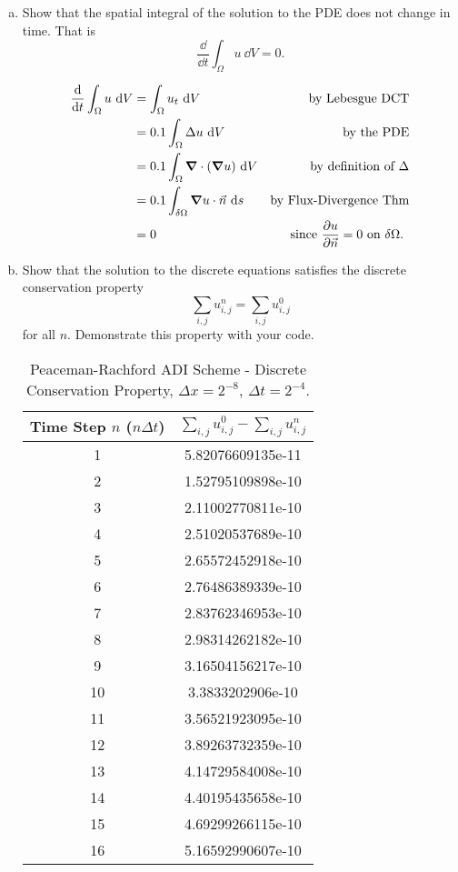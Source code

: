 \documentclass[12pt]{article}
\begin{document}
\begin{enumerate}[(a)]
\item Show that the spatial integral of the solution to the PDE does not change in time. That is $$\dfrac{\dd }{\dd t} \int_\Omega u \ \dd V = 0.$$

\begin{align*}
\dfrac{\dd }{\dd t} \int_\Omega u \ \dd V &= \int_\Omega u_t \ \dd V &\text{by Lebesgue DCT} \\
&= 0.1 \int_\Omega \Delta u \ \dd V &\text{ by the PDE} \\
&= 0.1 \int_\Omega \grad \cdot (\grad u) \ \dd V &\text{by definition of $\Delta$} \\
&= 0.1 \int_{\delta \Omega} \grad u \cdot \vec{n} \ \dd s &\text{by Flux-Divergence Thm} \\
&= 0 &\text{ since $\dfrac{\partial u}{\partial \vec{n}}=0 \text{ on } \delta \Omega$. }
\end{align*}

\item  Show that the solution to the discrete equations satisfies the discrete conservation property
$$\sum_{i,j} u_{i,j}^n = \sum_{i,j} u^0_{i,j} $$
for all $n$. Demonstrate this property with your code.

\begin{table}[H]
\caption{Peaceman-Rachford ADI Scheme - Discrete Conservation Property, $\Delta x = 2^{-8}$, $\Delta t = 2^{-4}$.}
\centering\begin{tabular}{|cc|}
\hline \hline
Time Step $n$ ($n\Delta t$) & $\sum_{i,j} u_{i,j}^0 - \sum_{i,j} u^n_{i,j}$ \\
\hline  
1 & 5.82076609135e-11 \\
2 & 1.52795109898e-10 \\
3 & 2.11002770811e-10 \\
4 & 2.51020537689e-10 \\
5 & 2.65572452918e-10 \\
6 & 2.76486389339e-10 \\
7 & 2.83762346953e-10 \\
8 & 2.98314262182e-10 \\
9 & 3.16504156217e-10 \\
10 & 3.3833202906e-10 \\
11 & 3.56521923095e-10 \\
12 & 3.89263732359e-10 \\
13 & 4.14729584008e-10 \\
14 & 4.40195435658e-10 \\
15 & 4.69299266115e-10 \\
16 & 5.16592990607e-10 \\
\hline \hline
\end{tabular}
\end{table}


\end{enumerate}
\end{document}
